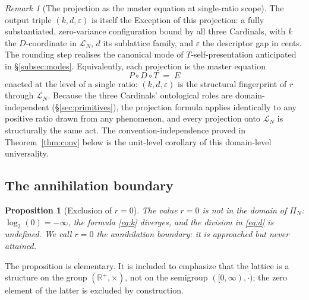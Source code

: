 \documentclass[11pt,a4paper]{article}
\newtheorem{proposition}[theorem]{Proposition}
\theoremstyle{definition}
\theoremstyle{remark}
\newtheorem{remark}[theorem]{Remark}
\newcommand{\R}{\mathbb{R}}
\newcommand{\eps}{\varepsilon}
\newcommand{\PDT}{\ensuremath{P{\circ}D{\circ}T}}
\begin{document}
\begin{remark}[The projection as the master equation at single-ratio scope]\label{rem:single-ratio-exception}
The output triple $(k,d,\eps)$ is itself the Exception of this projection: a fully substantiated, zero-variance configuration bound by all three Cardinals, with $k$ the $D$-coordinate in $\mathcal{L}_{N}$, $d$ its sublattice family, and $\eps$ the descriptor gap in cents. The rounding step realises the canonical mode of $T$-self-presentation anticipated in \S\ref{subsec:modes}. Equivalently, each projection is the master equation
\[
\PDT \;=\; E
\]
enacted at the level of a single ratio: $(k,d,\eps)$ is the structural fingerprint of $r$ through $\mathcal{L}_{N}$. Because the three Cardinals' ontological roles are domain-independent (\S\ref{sec:primitives}), the projection formula applies identically to any positive ratio drawn from any phenomenon, and every projection onto $\mathcal{L}_{N}$ is structurally the same act. The convention-independence proved in Theorem~\ref{thm:conv} below is the unit-level corollary of this domain-level universality.
\end{remark}

\subsection{The annihilation boundary}\label{subsec:annihilation}

\begin{proposition}[Exclusion of $r=0$]\label{prop:zero}
The value $r=0$ is not in the domain of $\Pi_{N}$: $\log_{2}(0)=-\infty$, the formula \eqref{eq:k} diverges, and the division in \eqref{eq:d} is undefined. We call $r=0$ the \emph{annihilation boundary}: it is approached but never attained.
\end{proposition}

The proposition is elementary. It is included to emphasize that the lattice is a structure on the group $(\R^{+},\times)$, not on the semigroup $([0,\infty),\cdot)$; the zero element of the latter is excluded by construction.
\end{document}
